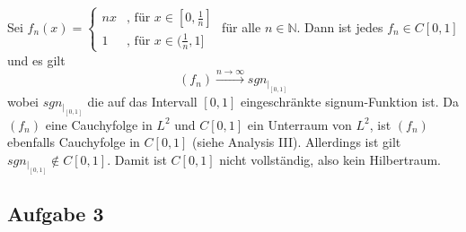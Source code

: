 \documentclass[11pt,a4paper,ngerman]{article}
\begin{document}
  Sei $f_n (x) = \begin{cases}
                nx & \text{, für $x \in [0,\frac{1}{n}]$} \\
                1 & \text{, für $x \in (\frac{1}{n},1]$}
             \end{cases}$ für alle $n \in \mathbb{N}$. Dann ist jedes $f_n \in C[0,1]$ und es gilt
  \begin{equation*}
    \left( f_n \right) \stackrel{n \to \infty}{\longrightarrow} sgn_{{\left. \right|}_{[0,1]}}
  \end{equation*}
  wobei $sgn_{{\left. \right|}_{[0,1]}}$ die auf das Intervall $[0,1]$ eingeschränkte signum-Funktion ist.
  Da $\left(f_n\right)$ eine Cauchyfolge in $L^2$ und $C[0,1]$ ein Unterraum von $L^2$,
  ist $\left(f_n\right)$ ebenfalls Cauchyfolge in $C[0,1]$ (siehe Analysis III).
  Allerdings ist gilt $ sgn_{{\left. \right|}_{[0,1]}} \notin C[0,1]$.
  Damit ist $C[0,1]$ nicht vollständig, also kein Hilbertraum.
  
\subsection*{Aufgabe 3}

\label{LastPage}
\end{document}
